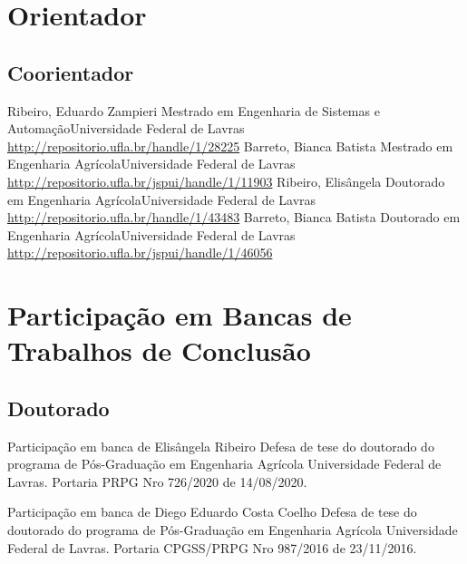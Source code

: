 \documentclass[11pt,a4paper,sans]{moderncv} %
\begin{document}
	       
\section{Orientador}
\subsection{Coorientador}
			{Ribeiro, Eduardo Zampieri}
			{Mestrado em Engenharia de Sistemas e Automação}{Universidade Federal de Lavras}
			{\url{http://repositorio.ufla.br/handle/1/28225}}
			{Barreto, Bianca Batista}
			{Mestrado em Engenharia Agrícola}{Universidade Federal de Lavras}
			{\url{http://repositorio.ufla.br/jspui/handle/1/11903}}
			{Ribeiro, Elisângela }
			{Doutorado em Engenharia Agrícola}{Universidade Federal de Lavras}
			{\url{http://repositorio.ufla.br/handle/1/43483}}
			{Barreto, Bianca Batista}
			{Doutorado em Engenharia Agrícola}{Universidade Federal de Lavras}
			{\url{http://repositorio.ufla.br/jspui/handle/1/46056}}
			
\section{Participação em Bancas de Trabalhos de Conclusão}
\subsection{Doutorado}

			{Participação em banca de Elisângela Ribeiro}
			{Defesa de tese do doutorado do programa de Pós-Graduação em Engenharia Agrícola}{}
			{Universidade Federal de Lavras. Portaria PRPG Nro 726/2020 de 14/08/2020.}

			{Participação em banca de Diego Eduardo Costa Coelho}
			{Defesa de tese do doutorado do programa de Pós-Graduação em Engenharia Agrícola}{}
			{Universidade Federal de Lavras. Portaria CPGSS/PRPG Nro 987/2016 de 23/11/2016.}
\end{document}
